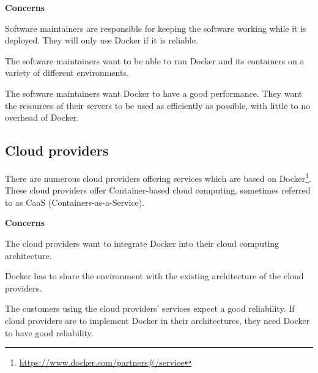 \textbf{Concerns}
\begin{description}[labelindent=25pt,style=multiline,leftmargin=4.0cm,font=\normalfont\itshape]

\item[Reliability] Software maintainers are responsible for keeping the software working while it is deployed. They will only use Docker if it is reliable. 

\item[Portability] The software maintainers want to be able to run Docker and its containers on a variety of different environments.

\item[Performance] The software maintainers want Docker to have a good performance. They want the resources of their servers to be used as efficiently as possible, with little to no overhead of Docker.

\end{description}



\subsection*{Cloud providers}
There are numerous cloud providers offering services which are based on Docker\footnote{\url{https://www.docker.com/partners\#/service}}. These cloud providers offer Container-based cloud computing, sometimes referred to as CaaS (Containers-as-a-Service).


\textbf{Concerns}
\begin{description}[labelindent=25pt,style=multiline,leftmargin=4.0cm,font=\normalfont\itshape]

\item[Implementability] The cloud providers want to integrate Docker into their cloud computing architecture.

\item[Co-Existence] Docker has to share the environment with the existing architecture of the cloud providers.

\item[Reliability] The customers using the cloud providers' services expect a good reliability. If cloud providers are to implement Docker in their architectures, they need Docker to have good reliability.

\end{description}



